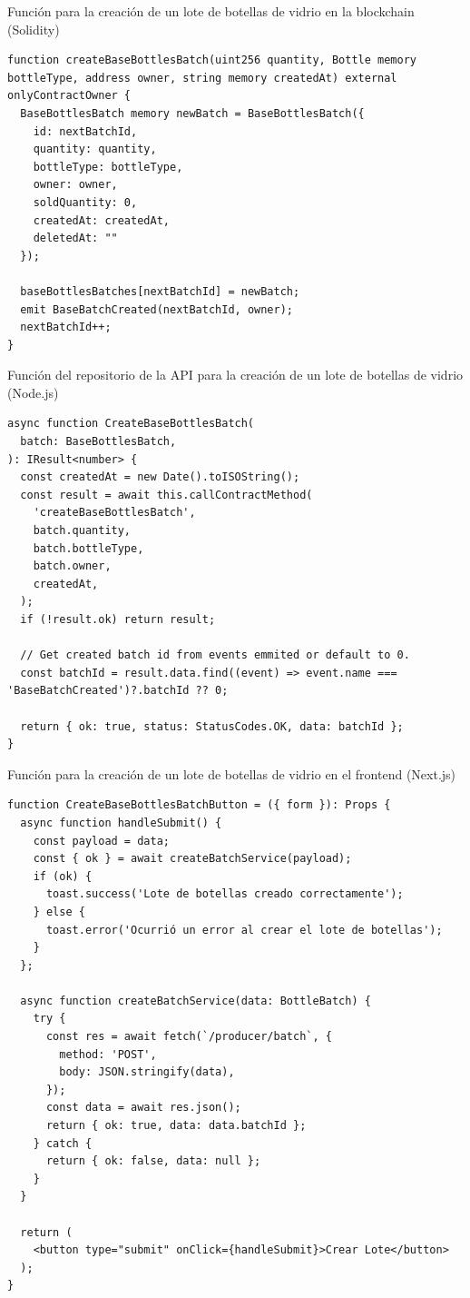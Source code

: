 
\begin{listing}[!tb]
\caption{Función para la creación de un lote de botellas de vidrio en la blockchain (Solidity)}
\label{listing:solidity-create-batch-code}
\begin{verbatim}
function createBaseBottlesBatch(uint256 quantity, Bottle memory bottleType, address owner, string memory createdAt) external onlyContractOwner {
  BaseBottlesBatch memory newBatch = BaseBottlesBatch({
    id: nextBatchId,
    quantity: quantity,
    bottleType: bottleType,
    owner: owner,
    soldQuantity: 0,
    createdAt: createdAt,
    deletedAt: ""
  });

  baseBottlesBatches[nextBatchId] = newBatch;
  emit BaseBatchCreated(nextBatchId, owner);
  nextBatchId++;
}
\end{verbatim}
\end{listing}

\begin{listing}[!tb]
\caption{Función del repositorio de la API para la creación de un lote de botellas de vidrio (Node.js)}
\label{listing:api-create-batch-code}
\begin{verbatim}
async function CreateBaseBottlesBatch(
  batch: BaseBottlesBatch,
): IResult<number> {
  const createdAt = new Date().toISOString();
  const result = await this.callContractMethod(
    'createBaseBottlesBatch',
    batch.quantity,
    batch.bottleType,
    batch.owner,
    createdAt,
  );
  if (!result.ok) return result;

  // Get created batch id from events emmited or default to 0.
  const batchId = result.data.find((event) => event.name === 'BaseBatchCreated')?.batchId ?? 0;

  return { ok: true, status: StatusCodes.OK, data: batchId };
}
\end{verbatim}
\end{listing}

\begin{listing}[!tb]
\caption{Función para la creación de un lote de botellas de vidrio en el frontend (Next.js)}
\label{listing:frontend-create-batch-code}
\begin{verbatim}
function CreateBaseBottlesBatchButton = ({ form }): Props {
  async function handleSubmit() {
    const payload = data;
    const { ok } = await createBatchService(payload);
    if (ok) {
      toast.success('Lote de botellas creado correctamente');
    } else {
      toast.error('Ocurrió un error al crear el lote de botellas');
    }
  };

  async function createBatchService(data: BottleBatch) {
    try {
      const res = await fetch(`/producer/batch`, {
        method: 'POST',
        body: JSON.stringify(data),
      });
      const data = await res.json();
      return { ok: true, data: data.batchId };
    } catch {
      return { ok: false, data: null };
    }
  }

  return (
    <button type="submit" onClick={handleSubmit}>Crear Lote</button>
  );
}
\end{verbatim}
\end{listing}

